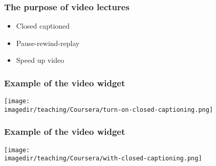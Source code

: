 \begin{frame}\frametitle{The purpose of video lectures}
			\begin{itemize}
				\item	Closed captioned
				\item	Pause-rewind-replay
				\item	Speed up video
			\end{itemize}
\end{frame}

\begin{frame}\frametitle{Example of the video widget}
	\begin{exampleblock}{}
		\centerline{\texttt{[image: \\imagedir/teaching/Coursera/turn-on-closed-captioning.png]}}
	\end{exampleblock}
\end{frame}

\begin{frame}\frametitle{Example of the video widget}
	\begin{exampleblock}{}
		\centerline{\texttt{[image: \\imagedir/teaching/Coursera/with-closed-captioning.png]}}
	\end{exampleblock}
\end{frame}




